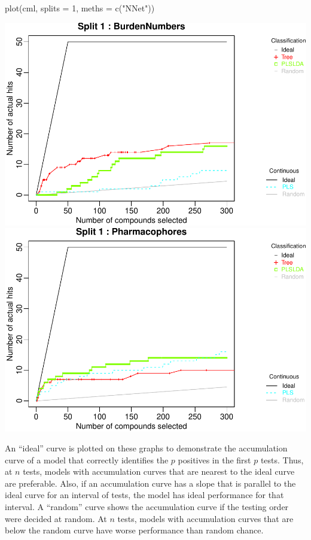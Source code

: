 \begin{Schunk}
\begin{Sinput}
plot(cml, splits = 1, meths = c("NNet"))
\end{Sinput}

\includegraphics{chemmodlabRJournal_files/figure-latex/accumulation_curves-1} 
\includegraphics{chemmodlabRJournal_files/figure-latex/accumulation_curves-2} \end{Schunk}

An ``ideal'' curve is plotted on these graphs to demonstrate the
accumulation curve of a model that correctly identifies the \(p\)
positives in the first \(p\) tests. Thus, at \(n\) tests, models with
accumulation curves that are nearest to the ideal curve are preferable.
Also, if an accumulation curve has a slope that is parallel to the ideal
curve for an interval of tests, the model has ideal performance for that
interval. A ``random'' curve shows the accumulation curve if the testing
order were decided at random. At \(n\) tests, models with accumulation
curves that are below the random curve have worse performance than
random chance.

